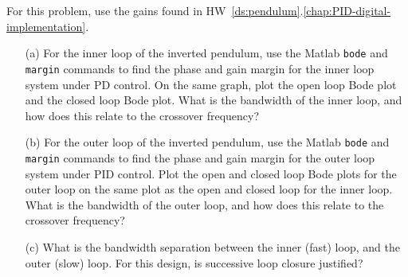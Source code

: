 For this problem, use the gains found in HW~\ref{ds:pendulum}.\ref{chap:PID-digital-implementation}.
\begin{itemize} \item[]
\item[(a)]  For the inner loop of the inverted pendulum, use the Matlab \texttt{bode} and \texttt{margin} commands to find the phase and gain margin for the inner loop system under PD control.  On the same graph, plot the open loop Bode plot and the closed loop Bode plot.  What is the bandwidth of the inner loop, and how does this relate to the crossover frequency?

\item[(b)]  For the outer loop of the inverted pendulum, use the Matlab \texttt{bode} and \texttt{margin} commands to find the phase and gain margin for the outer loop system under PID control.  Plot the open and closed loop Bode plots for the outer loop on the same plot as the open and closed loop for the inner loop.  What is the bandwidth of the outer loop, and how does this relate to the crossover frequency?

\item[(c)]  What is the bandwidth separation between the inner (fast) loop, and the outer (slow) loop.  For this design, is successive loop closure justified?
\end{itemize}
